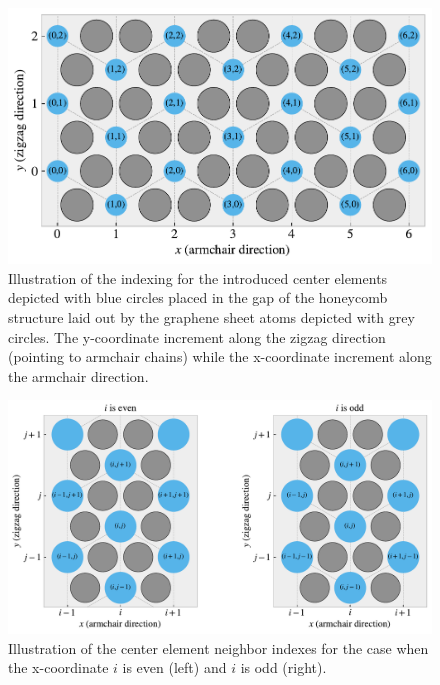 \begin{figure}[!htb]
  \centering
  \includegraphics[width=0.75\linewidth]{figures/system/center_indexing.pdf}
  \caption{Illustration of the indexing for the introduced center elements depicted with blue circles placed in the gap of the honeycomb structure laid out by the graphene sheet atoms depicted with grey circles. The y-coordinate increment along the zigzag direction (pointing to armchair chains) while the x-coordinate increment along the armchair direction.}
  \label{fig:center_indexing}
\end{figure}

\begin{figure}[!htb]
  \centering
  \includegraphics[width=0.75\linewidth]{figures/system/center_directions.pdf}
  \caption{Illustration of the center element neighbor indexes for the case when the x-coordinate $i$ is even (left) and $i$ is odd (right).}
  \label{fig:center_directions}
\end{figure}

